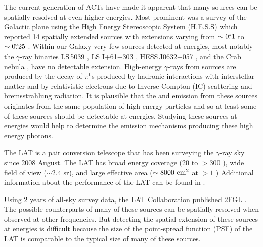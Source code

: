 The current generation of \acp{ACT} have made it apparent
that many sources can be spatially resolved at even higher energies.
Most prominent was a survey of the Galactic plane using the High Energy
Stereoscopic System (H.E.S.S) which reported 14 spatially extended
sources with extensions varying from $\sim0\mbox{$.\!\!^\circ$}1$ to $\sim0\mbox{$.\!\!^\circ$}25$
\citep{aharonian_2006_h.e.s.s.-survey}.  Within our Galaxy very few
sources detected at \tev energies, most notably the $\gamma$-ray
binaries LS\,5039 \citep{aharonian_2006a_orbital-modulation},
LS I+61$-$303 \citep{albert_2006a_variable-very-high-energy,
acciari_2011a_veritas-observations}, HESS\,J0632+057
\citep{aharonian_2007a_discovery-point-like}, and the Crab nebula
\citep{weekes_1989a_observation-gamma}, have no detectable extension.
High-energy $\gamma$-rays from \tev sources are produced by the decay
of $\pi^0$s produced by hadronic interactions with interstellar matter
and by relativistic electrons due to Inverse Compton (IC) scattering and
bremsstrahlung radiation.  It is plausible that the \gev and \tev emission
from these sources originates from the same population of high-energy
particles and so at least some of these sources should be detectable at
\gev energies.  Studying these \tev sources at \gev energies would help
to determine the emission mechanisms producing these high energy photons.

The LAT is a pair conversion telescope that has been surveying
the $\gamma$-ray sky since 2008 August.  The LAT has broad energy
coverage (20 \mev to $>300$ \gev), wide field of view ($\sim 2.4$
sr), and large effective area ($\sim 8000\ \cm^2$ at $>1$ \gev)
Additional information about the performance of the LAT can be found
in \cite{atwood_2009a_large-telescope}.

Using 2 years of all-sky survey data, the LAT Collaboration published
2FGL \citep[2FGL,][]{nolan_2012_fermi-large}.  The possible counterparts
of many of these sources can be spatially resolved when observed at other
frequencies. But detecting the spatial extension of these sources at \gev
energies is difficult because the size of the point-spread function (PSF)
of the LAT is comparable to the typical size of many of these sources.

